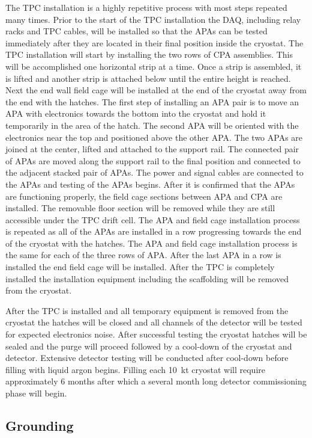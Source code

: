 The TPC installation is a highly repetitive process with most steps
repeated many times. Prior to the start of the TPC installation the
DAQ, including relay racks and TPC cables, will be installed so that
the APAs can be tested immediately after they are located in their
final position inside the cryostat. The TPC installation will start by
installing the two rows of CPA assemblies. This will be accomplished
one horizontal strip at a time. Once a strip is assembled, it is
lifted and another strip is attached below until the entire height is
reached. Next the end wall field cage will be installed at the end of
the cryostat away from the end with the hatches. The first step of
installing an APA pair is to move an APA with electronics towards the
bottom into the cryostat and hold it temporarily in the area of the
hatch. The second APA will be oriented with the electronics near the
top and positioned above the other APA. The two APAs are joined at the
center, lifted and attached to the support rail. The connected pair of
APAs are moved along the support rail to the final position and
connected to the adjacent stacked pair of APAs.  The power and signal
cables are connected to the APAs and testing of the APAs begins. After
it is confirmed that the APAs are functioning properly, the field cage
sections between APA and CPA are installed. The removable floor
section will be removed while they are still accessible under the TPC
drift cell.  The APA and field cage installation process is repeated
as all of the APAs are installed in a row progressing towards the end
of the cryostat with the hatches. The APA and field cage installation
process is the same for each of the three rows of APA. After the last
APA in a row is installed the end field cage will be installed. After
the TPC is completely installed the installation equipment including
the scaffolding will be removed from the cryostat.

After the TPC is installed and all temporary equipment is removed from
the cryostat the hatches will be closed and all channels of the
detector will be tested for expected electronics noise. After
successful testing the cryostat hatches will be sealed and the purge
will proceed followed by a cool-down of the cryostat and detector.
Extensive detector testing will be conducted after cool-down before
filling with liquid argon begins. Filling each 10~kt cryostat will
require approximately 6 months after which a several month long
detector commissioning phase will begin.

\subsection{Grounding}
\label{sec:detectors-fd-ref-install-ground}

